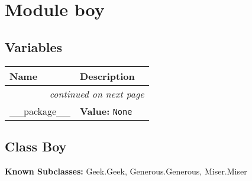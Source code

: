 %
%
%


\section{Module boy}

    \label{boy}


  \subsection{Variables}

    \vspace{-1cm}
\hspace{\varindent}\begin{longtable}{|p{\varnamewidth}|p{\vardescrwidth}|l}
\cline{1-2}
\cline{1-2} \centering \textbf{Name} & \centering \textbf{Description}& \\
\cline{1-2}
\endhead\cline{1-2}\multicolumn{3}{r}{\small\textit{continued on next page}}\\\endfoot\cline{1-2}
\endlastfoot\raggedright \_\-\_\-p\-a\-c\-k\-a\-g\-e\-\_\-\_\- & \raggedright \textbf{Value:} 
{\tt None}&\\
\cline{1-2}
\end{longtable}



\subsection{Class Boy}

    \label{boy:Boy}
\textbf{Known Subclasses:}
Geek.Geek,
    Generous.Generous,
    Miser.Miser


